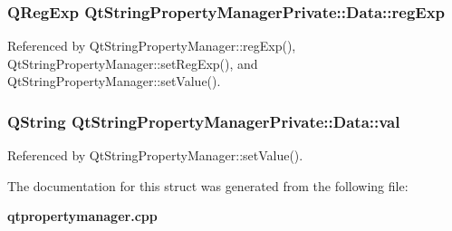 \subsubsection[{reg\+Exp}]{\setlength{\rightskip}{0pt plus 5cm}Q\+Reg\+Exp Qt\+String\+Property\+Manager\+Private\+::\+Data\+::reg\+Exp}\label{structQtStringPropertyManagerPrivate_1_1Data_a453c1121e3c1147457723a7655090de1}


Referenced by Qt\+String\+Property\+Manager\+::reg\+Exp(), Qt\+String\+Property\+Manager\+::set\+Reg\+Exp(), and Qt\+String\+Property\+Manager\+::set\+Value().

\subsubsection[{val}]{\setlength{\rightskip}{0pt plus 5cm}Q\+String Qt\+String\+Property\+Manager\+Private\+::\+Data\+::val}\label{structQtStringPropertyManagerPrivate_1_1Data_a074cd6db916b125699fc0be02017a61b}


Referenced by Qt\+String\+Property\+Manager\+::set\+Value().



The documentation for this struct was generated from the following file\+:\begin{DoxyCompactItemize}
\item 
{\bf qtpropertymanager.\+cpp}\end{DoxyCompactItemize}
